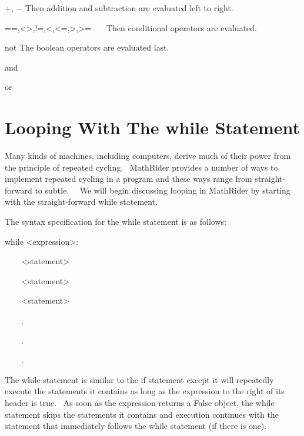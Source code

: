 \documentclass[12pt,twoside]{book}
\begin{document}
\bigskip

+, $-$ Then addition and subtraction are evaluated left to right.


\bigskip

==,{\textless}{\textgreater},!=,{\textless},{\textless}=,{\textgreater},{\textgreater}= \ \ \ Then conditional operators are evaluated.


\bigskip

not The boolean operators are evaluated last.


\bigskip

and 


\bigskip

or 


\bigskip


\bigskip


\bigskip

\section[Looping With The while Statement]{Looping With The while Statement}

Many kinds of machines, including computers, derive much of their power from the principle of repeated cycling. \ MathRider provides a number of ways to implement repeated cycling in a program and these ways range from straight{}-forward to subtle. \ \ We will begin discussing looping in MathRider by starting with the straight{}-forward while statement. 

\bigskip

The syntax specification for the while statement is as follows:



while {\textless}expression{\textgreater}:

\ \ \ \ {\textless}statement{\textgreater}

\ \ \ \ {\textless}statement{\textgreater}

\ \ \ \ {\textless}statement{\textgreater}

\ \ \ \ .

\ \ \ \ .

\ \ \ \ .


\bigskip

The while statement is similar to the if statement except it will repeatedly execute the statements it contains as long as the expression to the right of its header is true. \ As soon as the expression returns a False object, the while statement skips the statements it contains and execution continues with the statement that immediately follows the while statement (if there is one).  
\end{document}
